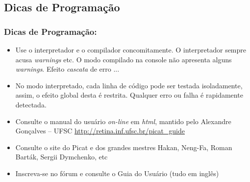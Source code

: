 \subsection{Dicas de Programação}
\begin{frame}[fragile] 

    \frametitle{Dicas de Programação:}

    \begin{itemize}
      \item Use o interpretador e o compilador concomitamente. O interpretador
      sempre acusa \textit{warnings} etc. O modo compilado na console não apresenta
      alguns \textit{warnings}. Efeito \textit{cascata} de erro ...

      \pause
      \item No modo interpretado, cada linha de código pode ser testada isoladamente,
      assim, o efeito global desta é restrita. Qualquer erro ou falha é rapidamente
      detectada.

       \pause
      \item Consulte o manual do usuário \textit{on-line} em \textit{html}, 
      mantido pelo Alexandre Gonçalves -- UFSC
      \url{http://retina.inf.ufsc.br/picat_guide}


      \pause
      \item Consulte o site do Picat e dos grandes mestres Hakan, Neng-Fa, Roman Barták, 
      Sergii Dymchenko, etc

      \pause
      \item Inscreva-se no fórum e consulte o Guia do Usuário (tudo em inglês)


    \end{itemize}
\end{frame}


